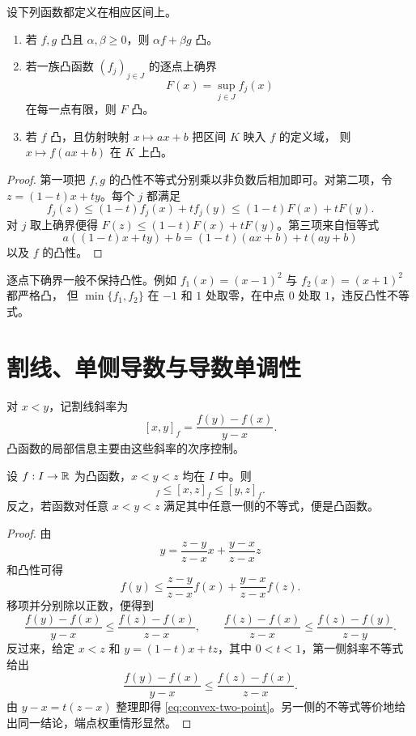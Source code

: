 \begin{proposition}[凸性的保持运算]
\label{prop:convexity-preserving-operations}
设下列函数都定义在相应区间上。
\begin{enumerate}
 \item 若 \(f,g\) 凸且 \(\alpha,\beta\ge0\)，则 \(\alpha f+\beta g\) 凸。
 \item 若一族凸函数 \((f_j)_{j\in J}\) 的逐点上确界
 \[
  F(x)=\sup_{j\in J}f_j(x)
 \]
 在每一点有限，则 \(F\) 凸。
 \item 若 \(f\) 凸，且仿射映射 \(x\mapsto ax+b\) 把区间 \(K\) 映入 \(f\) 的定义域，
 则 \(x\mapsto f(ax+b)\) 在 \(K\) 上凸。
\end{enumerate}
\end{proposition}

\begin{proof}
第一项把 \(f,g\) 的凸性不等式分别乘以非负数后相加即可。对第二项，令
\(z=(1-t)x+ty\)。每个 \(j\) 都满足
\[
 f_j(z)\le(1-t)f_j(x)+tf_j(y)
 \le(1-t)F(x)+tF(y).
\]
对 \(j\) 取上确界便得 \(F(z)\le(1-t)F(x)+tF(y)\)。第三项来自恒等式
\[
 a((1-t)x+ty)+b=(1-t)(ax+b)+t(ay+b)
\]
以及 \(f\) 的凸性。
\end{proof}

逐点下确界一般不保持凸性。例如 \(f_1(x)=(x-1)^2\) 与 \(f_2(x)=(x+1)^2\) 都严格凸，
但 \(\min\{f_1,f_2\}\) 在 \(-1\) 和 \(1\) 处取零，在中点 \(0\) 处取 \(1\)，违反凸性不等式。

\section{割线、单侧导数与导数单调性}

对 \(x<y\)，记割线斜率为
\[
 [x,y]_f=\frac{f(y)-f(x)}{y-x}.
\]
凸函数的局部信息主要由这些斜率的次序控制。

\begin{theorem}[三点斜率不等式]
\label{thm:convex-three-slopes}
设 \(f:I\to\mathbb{R}\) 为凸函数，\(x<y<z\) 均在 \(I\) 中。则
\begin{equation}
 [x,y]_f\le [x,z]_f\le[y,z]_f.
 \label{eq:convex-three-slopes}
\end{equation}
反之，若函数对任意 \(x<y<z\) 满足其中任意一侧的不等式，便是凸函数。
\end{theorem}

\begin{proof}
由
\[
 y=\frac{z-y}{z-x}x+\frac{y-x}{z-x}z
\]
和凸性可得
\[
 f(y)\le\frac{z-y}{z-x}f(x)+\frac{y-x}{z-x}f(z).
\]
移项并分别除以正数，便得到
\[
 \frac{f(y)-f(x)}{y-x}\le\frac{f(z)-f(x)}{z-x},
 \qquad
 \frac{f(z)-f(x)}{z-x}\le\frac{f(z)-f(y)}{z-y}.
\]
反过来，给定 \(x<z\) 和 \(y=(1-t)x+tz\)，其中 \(0<t<1\)，第一侧斜率不等式给出
\[
 \frac{f(y)-f(x)}{y-x}\le\frac{f(z)-f(x)}{z-x}.
\]
由 \(y-x=t(z-x)\) 整理即得 \eqref{eq:convex-two-point}。另一侧的不等式等价地给出同一结论，端点权重情形显然。
\end{proof}

